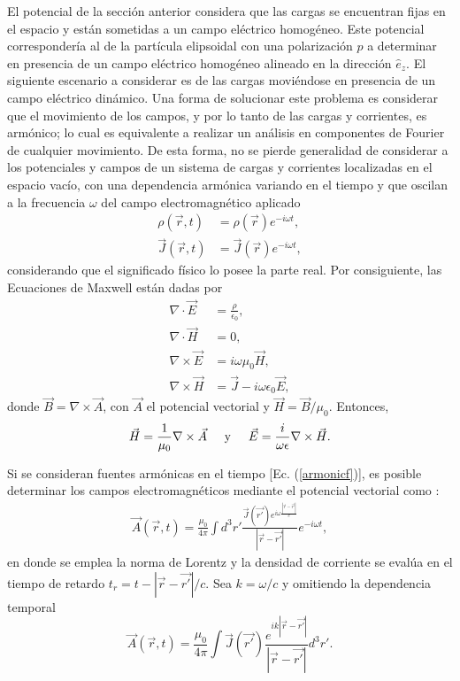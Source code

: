 El potencial de la sección anterior considera que las cargas se encuentran fijas en el espacio y están sometidas a un campo eléctrico homogéneo. Este potencial correspondería al de la partícula elipsoidal con una polarización $p$ a determinar en presencia de un campo eléctrico homogéneo alineado en la dirección $\hat{e}_z$. El siguiente escenario a considerar es de las cargas moviéndose en presencia de un campo eléctrico dinámico. Una forma de solucionar este problema es considerar que el movimiento de los campos, y por lo tanto de las cargas y corrientes, es armónico; lo cual es equivalente a realizar un análisis en componentes de Fourier de cualquier movimiento. De esta forma, no se pierde generalidad de considerar a los potenciales y campos de un sistema de cargas y corrientes localizadas en el espacio vacío, con una dependencia armónica variando en el tiempo y que oscilan a la frecuencia $\omega$ del campo electromagnético aplicado \cite{Jackson}
\begin{align}
    \rho(\Vec{r},t)&=\rho(\Vec{r})e^{-i\omega t},\nonumber\\
    \Vec{J}(\Vec{r},t)&=\Vec{J}(\Vec{r})e^{-i\omega t},
    \label{armonicf}
\end{align}
considerando que el significado físico lo posee la parte real. Por consiguiente, las Ecuaciones de Maxwell están dadas por
\begin{align}
	\nabla\cdot\Vec{E}&=\frac{\rho}{\epsilon_0},\\
	\nabla\cdot\Vec{H}&=0,\\
	\nabla\times\Vec{E}&=i\omega\mu_0\Vec{H},\\
	\nabla\times\Vec{H}&=\Vec{J}-i\omega\epsilon_0\Vec{E},
\end{align}
donde $\Vec{B}=\nabla\times\Vec{A}$, con $\Vec{A}$ el potencial vectorial y $ \Vec{H}=\Vec{B}/\mu_0$. Entonces,
\begin{equation}
	\Vec{H}=\frac{1}{\mu_0}\nabla\times\Vec{A}\hspace{0.5cm}\mbox{y}\hspace{0.5cm}    \Vec{E}=\frac{i}{\omega\epsilon}\nabla\times\Vec{H}.
\end{equation}

Si se consideran fuentes armónicas en el tiempo [Ec. (\ref{armonicf})], es posible determinar los campos electromagnéticos mediante el potencial vectorial como \cite{Jackson}:
\begin{align*}
  \Vec{A}(\Vec{r},t)=\frac{\mu_0}{4\pi}\int d^3r'\frac{\Vec{J}(\Vec{r'})e^{i\omega \frac{|\Vec{r}-\Vec{r'}|}{c}}}{|\Vec{r}-\Vec{r'}|}e^{-i\omega t},
\end{align*}
en donde se emplea la norma de Lorentz \cite{Griffiths} y la densidad de corriente se evalúa en el tiempo de retardo $t_r=t-|\Vec{r}-\Vec{r'}|/c$. Sea $k=\omega/c$ y omitiendo la dependencia temporal
\begin{equation}
    \Vec{A}(\Vec{r},t)=\frac{\mu_0}{4\pi}\int \Vec{J}(\Vec{r'})\frac{e^{ik|\Vec{r}-\Vec{r'}|}}{|\Vec{r}-\Vec{r'}|} d^3r'.
    \label{pot_vectorial}
\end{equation} 

